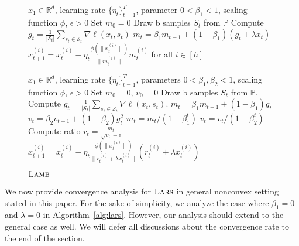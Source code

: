 \begin{figure}
\begin{minipage}[b]{.48\textwidth}
\begin{algorithm}[H]\small
	\caption{$\lars$}
	\label{alg:lars}
	\begin{algorithmic}
		 $x_1 \in \mathbb{R}^d$, learning rate $\{\eta_t\}_{t=1}^T$, parameter $0 < \beta_{1} < 1$, scaling function $\phi$, $\epsilon > 0$
		\STATE Set $m_{0} = 0$
		\STATE Draw b samples $S_t$ from $\mathbb{P}$
        \STATE Compute $g_t = \frac{1}{|\mathcal{S}_t|} \sum_{s_t \in \mathcal{S}_t}\nabla \ell(x_t, s_t)$
        \STATE $m_{t} = \beta_{1} m_{t-1} + (1 - \beta_{1}) (g_{t} + \lambda x_t)$
		\STATE $x_{t+1}^{(i)} = x_{t}^{(i)} - \eta_t \frac{\phi(\|x_t^{(i)}\|)}{\|m_t^{(i)}\|} m_t^{(i)}$ for all $i \in [h]$
		\ENDFOR
	\end{algorithmic}
\end{algorithm}
\end{minipage}\hfill%
\begin{minipage}[b]{.5\textwidth}
\begin{algorithm}[H]\small
	\caption{$\textsc{Lamb}$}
	\label{alg:lamb}
	\begin{algorithmic}
		 $x_1 \in \mathbb{R}^d$, learning rate $\{\eta_t\}_{t=1}^T$,  parameters $0 < \beta_{1}, \beta_2 < 1$, scaling function $\phi$, $\epsilon > 0$
		\STATE Set $m_{0} = 0$, $v_{0} = 0$
		\FOR{$t=1$ {\bf to} $T$}
		\STATE Draw b samples $S_t$ from $\mathbb{P}$.
        \STATE Compute $g_t = \frac{1}{|\mathcal{S}_t|} \sum_{s_t \in \mathcal{S}_t}\nabla \ell(x_t, s_t)$.
		\STATE  $m_{t} = \beta_{1} m_{t-1} + (1 - \beta_{1}) g_{t}$ 
		\STATE  $v_{t} = \beta_{2} v_{t-1} + (1 - \beta_{2}) g_{t}^2$
		\STATE $m_t = m_t/(1 - {\beta}_1^t)$ 
        \STATE $v_t = v_t/(1 - {\beta}_2^t)$
		\STATE Compute ratio $r_t = \frac{m_t}{\sqrt{v_t} + \epsilon}$
		\STATE $x_{t+1}^{(i)} = x_{t}^{(i)} - \eta_t \frac{\phi(\|x_t^{(i)}\|)}{\|r_t^{(i)} + \lambda x_t^{(i)}\|} (r_t^{(i)} + \lambda x_t^{(i)})$
		\ENDFOR
	\end{algorithmic}
\end{algorithm}
\end{minipage}
\end{figure}

We now provide convergence analysis for $\lars$ in general nonconvex setting stated in this paper. For the sake of simplicity, we analyze the case where $\beta_1 = 0$ and $\lambda = 0$ in Algorithm~\ref{alg:lars}. However, our analysis should extend to the general case as well. We will defer all discussions about the convergence rate to the end of the section.

